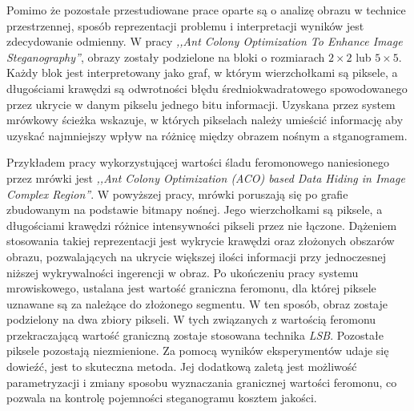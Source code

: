 {{{            %
            Pomimo że pozostałe przestudiowane prace oparte są o analizę obrazu w technice przestrzennej, sposób
            reprezentacji problemu i interpretacji wyników jest zdecydowanie odmienny. W pracy \textit{,,Ant Colony
            Optimization To Enhance Image Steganography''}\cite{ZghaerACOStegEN}, obrazy zostały podzielone na bloki o
            rozmiarach $2 \times 2$ lub $5 \times 5$. Każdy blok jest interpretowany jako graf, w którym wierzchołkami
            są piksele, a długościami krawędzi są odwrotności błędu średniokwadratowego spowodowanego przez ukrycie w
            danym pikselu jednego bitu informacji. Uzyskana przez system mrówkowy ścieżka wskazuje, w których pikselach
            należy umieścić informację aby uzyskać najmniejszy wpływ na różnicę między obrazem nośnym a
            stganogramem\cite{ZghaerACOStegEN}.

            Przykładem pracy wykorzystującej wartości śladu feromonowego naniesionego przez mrówki jest \textit{,,Ant
            Colony Optimization (ACO) based Data Hiding in Image Complex Region''}\cite{Khan2018AntCO}. W powyższej
            pracy, mrówki poruszają się po grafie zbudowanym na podstawie bitmapy nośnej. Jego wierzchołkami są piksele,
            a długościami krawędzi różnice intensywności pikseli przez nie łączone. Dążeniem stosowania takiej
            reprezentacji jest wykrycie krawędzi oraz złożonych obszarów obrazu, pozwalających na ukrycie większej
            ilości informacji przy jednoczesnej niższej wykrywalności ingerencji w obraz. Po ukończeniu pracy systemu
            mrowiskowego, ustalana jest wartość graniczna feromonu, dla której piksele uznawane są za należące do
            złożonego segmentu. W ten sposób, obraz zostaje podzielony na dwa zbiory pikseli. W tych związanych z
            wartością feromonu przekraczającą wartość graniczną zostaje stosowana technika \textit{LSB}. Pozostałe
            piksele pozostają niezmienione. Za pomocą wyników eksperymentów udaje się dowieźć, jest to skuteczna metoda.
            Jej dodatkową zaletą jest możliwość parametryzacji i zmiany sposobu wyznaczania granicznej wartości
            feromonu, co pozwala na kontrolę pojemności steganogramu kosztem jakości\cite{Khan2018AntCO}.
        }
    }

}
